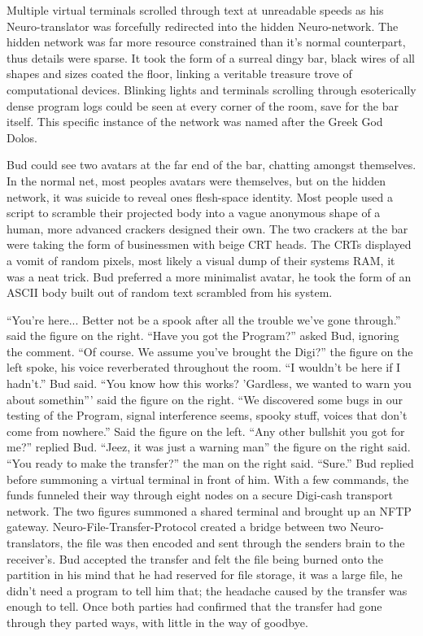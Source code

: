 \documentclass{book}
\begin{document}
Multiple virtual terminals scrolled through text at unreadable speeds as his Neuro-translator was forcefully redirected into the hidden Neuro-network. The hidden network was far more resource constrained than it's normal counterpart, thus details were sparse. It took the form of a surreal dingy bar, black wires of all shapes and sizes coated the floor, linking a veritable treasure trove of computational devices. Blinking lights and terminals scrolling through esoterically dense program logs could be seen at every corner of the room, save for the bar itself. This specific instance of the network was named after the Greek God Dolos.

Bud could see two avatars at the far end of the bar, chatting amongst themselves. In the normal net, most peoples avatars were themselves, but on the hidden network, it was suicide to reveal ones flesh-space identity. Most people used a script to scramble their projected body into a vague anonymous shape of a human, more advanced crackers designed their own. The two crackers at the bar were taking the form of businessmen with beige CRT heads. The CRTs displayed a vomit of random pixels, most likely a visual dump of their systems RAM, it was a neat trick. Bud preferred a more minimalist avatar, he took the form of an ASCII body built out of random text scrambled from his system.

``You're here... Better not be a spook after all the trouble we've gone through.'' said the figure on the right. ``Have you got the Program?'' asked Bud, ignoring the comment. ``Of course. We assume you've brought the Digi?'' the figure on the left spoke, his voice reverberated throughout the room. ``I wouldn't be here if I hadn't.'' Bud said. ``You know how this works? 'Gardless, we wanted to warn you about somethin''' said the figure on the right. ``We discovered some bugs in our testing of the Program, signal interference seems, spooky stuff, voices that don't come from nowhere.'' Said the figure on the left. ``Any other bullshit you got for me?'' replied Bud. ``Jeez, it was just a warning man'' the figure on the right said. ``You ready to make the transfer?'' the man on the right said. ``Sure.'' Bud replied before summoning a virtual terminal in front of him. With a few commands, the funds funneled their way through eight nodes on a secure Digi-cash transport network. The two figures summoned a shared terminal and brought up an NFTP gateway. Neuro-File-Transfer-Protocol created a bridge between two Neuro-translators, the file was then encoded and sent through the senders brain to the receiver's. Bud accepted the transfer and felt the file being burned onto the partition in his mind that he had reserved for file storage, it was a large file, he didn't need a program to tell him that; the headache caused by the transfer was enough to tell. Once both parties had confirmed that the transfer had gone through they parted ways, with little in the way of goodbye.
\end{document}
